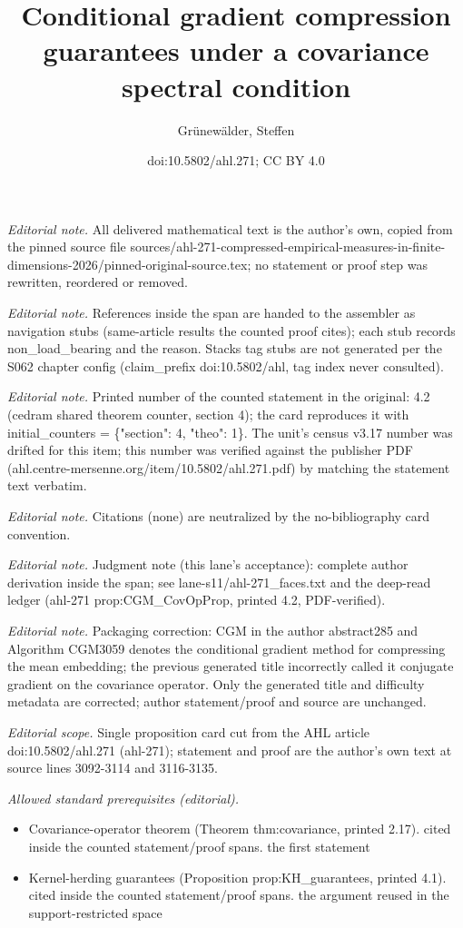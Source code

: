 \documentclass[11pt]{article}
\title{Conditional gradient compression guarantees under a covariance spectral condition}
\author{Grünewälder, Steffen}
\date{doi:10.5802/ahl.271; CC BY 4.0}
\begin{document}
\maketitle
\setcounter{section}{4}
\setcounter{theo}{1}
\noindent\textit{Editorial note.} All delivered mathematical text is the author's own, copied from the pinned source file sources/ahl-271-compressed-empirical-measures-in-finite-dimensions-2026/pinned-original-source.tex; no statement or proof step was rewritten, reordered or removed.\par\medskip
\noindent\textit{Editorial note.} References inside the span are handed to the assembler as navigation stubs (same-article results the counted proof cites); each stub records non\_load\_bearing and the reason. Stacks tag stubs are not generated per the S062 chapter config (claim\_prefix doi:10.5802/ahl, tag index never consulted).\par\medskip
\noindent\textit{Editorial note.} Printed number of the counted statement in the original: 4.2 (cedram shared theorem counter, section 4); the card reproduces it with initial\_counters = \{"section": 4, "theo": 1\}. The unit's census v3.17 number was drifted for this item; this number was verified against the publisher PDF (ahl.centre-mersenne.org/item/10.5802/ahl.271.pdf) by matching the statement text verbatim.\par\medskip
\noindent\textit{Editorial note.} Citations (none) are neutralized by the no-bibliography card convention.\par\medskip
\noindent\textit{Editorial note.} Judgment note (this lane's acceptance): complete author derivation inside the span; see lane-s11/ahl-271\_faces.txt and the deep-read ledger (ahl-271 prop:CGM\_CovOpProp, printed 4.2, PDF-verified).\par\medskip
\noindent\textit{Editorial note.} Packaging correction: CGM in the author abstract285 and Algorithm CGM3059 denotes the conditional gradient method for compressing the mean embedding; the previous generated title incorrectly called it conjugate gradient on the covariance operator. Only the generated title and difficulty metadata are corrected; author statement/proof and source are unchanged.\par\medskip
\noindent\textit{Editorial scope.} Single proposition card cut from the AHL article doi:10.5802/ahl.271 (ahl-271); statement and proof are the author's own text at source lines 3092-3114 and 3116-3135.\par\medskip
\noindent\textit{Allowed standard prerequisites (editorial).}\begin{itemize}
\item Covariance-operator theorem (Theorem thm:covariance, printed 2.17). cited inside the counted statement/proof spans. the first statement
\item Kernel-herding guarantees (Proposition prop:KH\_guarantees, printed 4.1). cited inside the counted statement/proof spans. the argument reused in the support-restricted space
\end{itemize}\medskip
\end{document}

